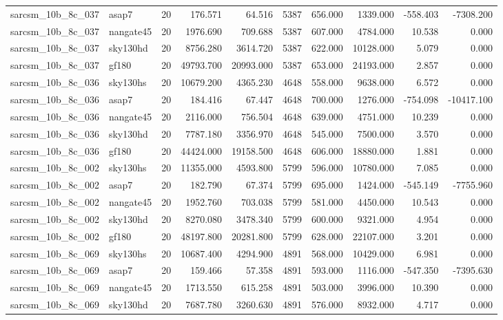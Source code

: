 \documentclass{article}
\begin{document}
\begin{longtable}{llrrrrrrrr}
sarcsm\_10b\_8c\_037 & asap7 & 20 & 176.571 & 64.516 & 5387 & 656.000 & 1339.000 & -558.403 & -7308.200 \\
sarcsm\_10b\_8c\_037 & nangate45 & 20 & 1976.690 & 709.688 & 5387 & 607.000 & 4784.000 & 10.538 & 0.000 \\
sarcsm\_10b\_8c\_037 & sky130hd & 20 & 8756.280 & 3614.720 & 5387 & 622.000 & 10128.000 & 5.079 & 0.000 \\
sarcsm\_10b\_8c\_037 & gf180 & 20 & 49793.700 & 20993.000 & 5387 & 653.000 & 24193.000 & 2.857 & 0.000 \\
sarcsm\_10b\_8c\_036 & sky130hs & 20 & 10679.200 & 4365.230 & 4648 & 558.000 & 9638.000 & 6.572 & 0.000 \\
sarcsm\_10b\_8c\_036 & asap7 & 20 & 184.416 & 67.447 & 4648 & 700.000 & 1276.000 & -754.098 & -10417.100 \\
sarcsm\_10b\_8c\_036 & nangate45 & 20 & 2116.000 & 756.504 & 4648 & 639.000 & 4751.000 & 10.239 & 0.000 \\
sarcsm\_10b\_8c\_036 & sky130hd & 20 & 7787.180 & 3356.970 & 4648 & 545.000 & 7500.000 & 3.570 & 0.000 \\
sarcsm\_10b\_8c\_036 & gf180 & 20 & 44424.000 & 19158.500 & 4648 & 606.000 & 18880.000 & 1.881 & 0.000 \\
sarcsm\_10b\_8c\_002 & sky130hs & 20 & 11355.000 & 4593.800 & 5799 & 596.000 & 10780.000 & 7.085 & 0.000 \\
sarcsm\_10b\_8c\_002 & asap7 & 20 & 182.790 & 67.374 & 5799 & 695.000 & 1424.000 & -545.149 & -7755.960 \\
sarcsm\_10b\_8c\_002 & nangate45 & 20 & 1952.760 & 703.038 & 5799 & 581.000 & 4450.000 & 10.543 & 0.000 \\
sarcsm\_10b\_8c\_002 & sky130hd & 20 & 8270.080 & 3478.340 & 5799 & 600.000 & 9321.000 & 4.954 & 0.000 \\
sarcsm\_10b\_8c\_002 & gf180 & 20 & 48197.800 & 20281.800 & 5799 & 628.000 & 22107.000 & 3.201 & 0.000 \\
sarcsm\_10b\_8c\_069 & sky130hs & 20 & 10687.400 & 4294.900 & 4891 & 568.000 & 10429.000 & 6.981 & 0.000 \\
sarcsm\_10b\_8c\_069 & asap7 & 20 & 159.466 & 57.358 & 4891 & 593.000 & 1116.000 & -547.350 & -7395.630 \\
sarcsm\_10b\_8c\_069 & nangate45 & 20 & 1713.550 & 615.258 & 4891 & 503.000 & 3996.000 & 10.390 & 0.000 \\
sarcsm\_10b\_8c\_069 & sky130hd & 20 & 7687.780 & 3260.630 & 4891 & 576.000 & 8932.000 & 4.717 & 0.000 \\

\end{longtable}
\end{document}
